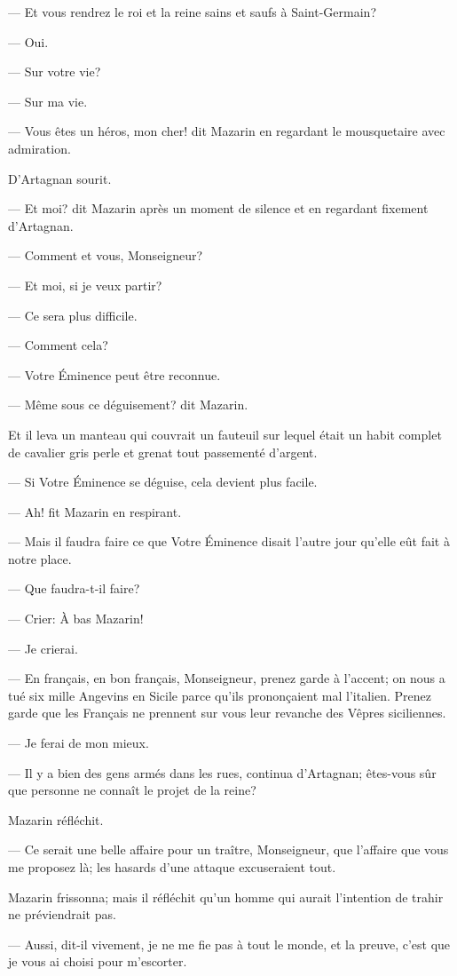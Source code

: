 — Et vous rendrez le roi et la reine sains et saufs à Saint-Germain?

— Oui.

— Sur votre vie?

— Sur ma vie.

— Vous êtes un héros, mon cher! dit Mazarin en regardant le mousquetaire avec admiration.

D'Artagnan sourit.

— Et moi? dit Mazarin après un moment de silence et en regardant fixement d'Artagnan.

— Comment et vous, Monseigneur?

— Et moi, si je veux partir?

— Ce sera plus difficile.

— Comment cela?

— Votre Éminence peut être reconnue.

— Même sous ce déguisement? dit Mazarin.

Et il leva un manteau qui couvrait un fauteuil sur lequel était un habit complet de cavalier gris perle et grenat tout passementé d'argent.

— Si Votre Éminence se déguise, cela devient plus facile.

— Ah! fit Mazarin en respirant.

— Mais il faudra faire ce que Votre Éminence disait l'autre jour qu'elle eût fait à notre place.

— Que faudra-t-il faire?

— Crier: À bas Mazarin!

— Je crierai.

— En français, en bon français, Monseigneur, prenez garde à l'accent; on nous a tué six mille Angevins en Sicile parce qu'ils prononçaient mal l'italien. Prenez garde que les Français ne prennent sur vous leur revanche des Vêpres siciliennes.

— Je ferai de mon mieux.

— Il y a bien des gens armés dans les rues, continua d'Artagnan; êtes-vous sûr que personne ne connaît le projet de la reine?

Mazarin réfléchit.

— Ce serait une belle affaire pour un traître, Monseigneur, que l'affaire que vous me proposez là; les hasards d'une attaque excuseraient tout.

Mazarin frissonna; mais il réfléchit qu'un homme qui aurait l'intention de trahir ne préviendrait pas.

— Aussi, dit-il vivement, je ne me fie pas à tout le monde, et la preuve, c'est que je vous ai choisi pour m'escorter.

